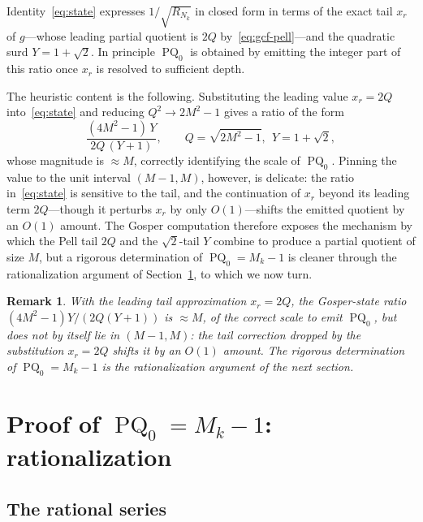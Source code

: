 \documentclass[10pt,a4paper]{amsart}
\newtheorem{remark}[theorem]{Remark}
\DeclareMathOperator{\PQ}{PQ}
\begin{document}
Identity~\eqref{eq:state} expresses $1/\sqrt{R_{N_k}}$ in closed form
in terms of the exact tail $x_r$ of $g$---whose leading partial quotient
is $2Q$ by~\eqref{eq:gcf-pell}---and the quadratic surd $Y = 1+\sqrt{2}$.
In principle $\PQ_0$ is obtained by emitting the integer part of this
ratio once $x_r$ is resolved to sufficient depth.

The heuristic content is the following.  Substituting the leading value
$x_r = 2Q$ into~\eqref{eq:state} and reducing $Q^2 \to 2M^2-1$ gives a
ratio of the form
\[
  \frac{(4M^2-1)\,Y}{2Q\,(Y+1)},
  \qquad Q = \sqrt{2M^2-1},\ \ Y = 1+\sqrt{2},
\]
whose magnitude is $\approx M$, correctly identifying the scale of
$\PQ_0$.  Pinning the value to the unit interval $(M-1, M)$, however,
is delicate: the ratio in~\eqref{eq:state} is sensitive to the tail, and
the continuation of $x_r$ beyond its leading term $2Q$---though it
perturbs $x_r$ by only $O(1)$---shifts the emitted quotient by an
$O(1)$ amount.  The Gosper computation therefore exposes the mechanism
by which the Pell tail $2Q$ and the $\sqrt{2}$-tail $Y$ combine to
produce a partial quotient of size $M$, but a rigorous determination of
$\PQ_0 = M_k - 1$ is cleaner through the rationalization argument of
Section~\ref{sec:rational}, to which we now turn.

\begin{remark}
  With the leading tail approximation $x_r = 2Q$, the Gosper-state
  ratio $(4M^2-1)Y/(2Q(Y+1))$ is $\approx M$, of the correct scale to
  emit $\PQ_0$, but does not by itself lie in $(M-1, M)$: the tail
  correction dropped by the substitution $x_r = 2Q$ shifts it by an
  $O(1)$ amount.  The rigorous determination of $\PQ_0 = M_k - 1$ is the
  rationalization argument of the next section.
\end{remark}

\section{Proof of $\PQ_0 = M_k-1$: rationalization}
\label{sec:rational}

\subsection{The rational series}
\end{document}
